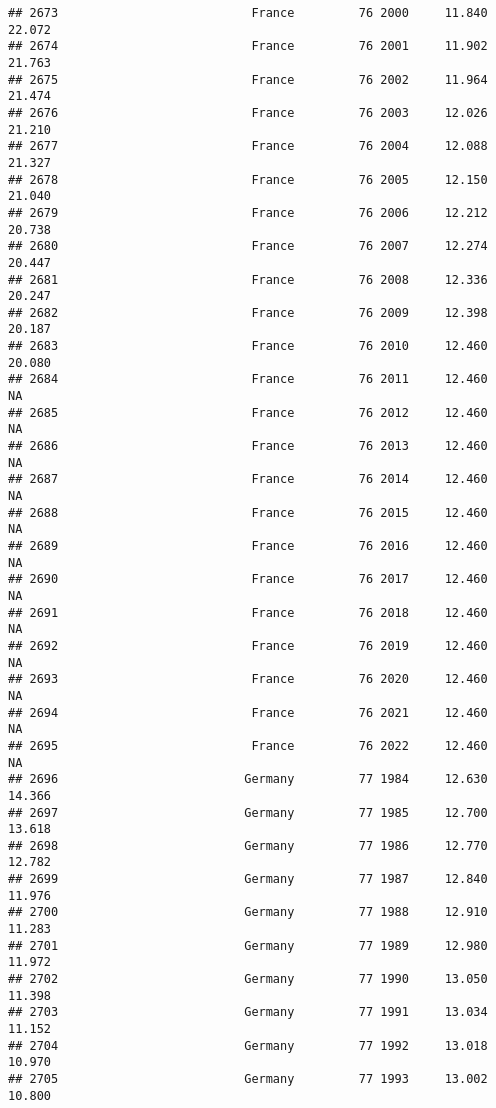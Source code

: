 \documentclass[
]{article}
\begin{document}
\begin{verbatim}
## 2673                           France         76 2000     11.840     22.072
## 2674                           France         76 2001     11.902     21.763
## 2675                           France         76 2002     11.964     21.474
## 2676                           France         76 2003     12.026     21.210
## 2677                           France         76 2004     12.088     21.327
## 2678                           France         76 2005     12.150     21.040
## 2679                           France         76 2006     12.212     20.738
## 2680                           France         76 2007     12.274     20.447
## 2681                           France         76 2008     12.336     20.247
## 2682                           France         76 2009     12.398     20.187
## 2683                           France         76 2010     12.460     20.080
## 2684                           France         76 2011     12.460         NA
## 2685                           France         76 2012     12.460         NA
## 2686                           France         76 2013     12.460         NA
## 2687                           France         76 2014     12.460         NA
## 2688                           France         76 2015     12.460         NA
## 2689                           France         76 2016     12.460         NA
## 2690                           France         76 2017     12.460         NA
## 2691                           France         76 2018     12.460         NA
## 2692                           France         76 2019     12.460         NA
## 2693                           France         76 2020     12.460         NA
## 2694                           France         76 2021     12.460         NA
## 2695                           France         76 2022     12.460         NA
## 2696                          Germany         77 1984     12.630     14.366
## 2697                          Germany         77 1985     12.700     13.618
## 2698                          Germany         77 1986     12.770     12.782
## 2699                          Germany         77 1987     12.840     11.976
## 2700                          Germany         77 1988     12.910     11.283
## 2701                          Germany         77 1989     12.980     11.972
## 2702                          Germany         77 1990     13.050     11.398
## 2703                          Germany         77 1991     13.034     11.152
## 2704                          Germany         77 1992     13.018     10.970
## 2705                          Germany         77 1993     13.002     10.800

\end{verbatim}
\end{document}
